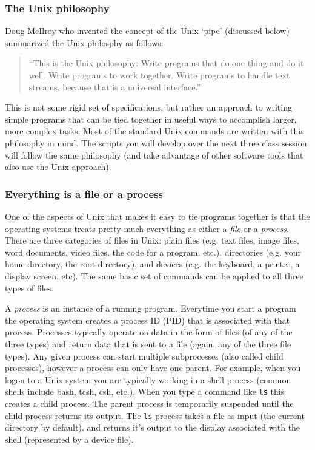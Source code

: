 \subsubsection{The Unix philosophy}

Doug McIlroy who invented the concept of the Unix `pipe' (discussed below) summarized the Unix philosphy as follows:

\begin{quote}
``This is the Unix philosophy: Write programs that do one thing and do it well. Write programs to work together. Write programs to handle text streams, because that is a universal interface.''
\end{quote}

This is not some rigid set of specifications, but rather an approach to writing simple programs that can be tied together in useful ways to accomplish larger, more complex tasks. Most of the standard Unix commands are written with this philosophy in mind. The scripts you will develop over the next three class session will follow the same philosophy (and take advantage of other software tools that also use the Unix approach).


\subsubsection{Everything is a file or a process}

One of the aspects of Unix that makes it easy to tie programs together is that the operating systems treats pretty much everything as either a \emph{file} or a \emph{process}.  There are three categories of files in Unix: plain files (e.g. text files, image files, word documents, video files, the code for a program, etc.), directories (e.g. your home directory, the root directory), and devices (e.g. the keyboard, a printer, a display screen, etc). The same basic set of commands can be applied to all three types of files.

A \emph{process} is an instance of a running program.  Everytime you start a program the operating system creates a process ID (PID) that is associated with that process. Processes typically operate on data in the form of files (of any of the three types) and return data that is sent to a file (again, any of the three file types). Any given process can start multiple subprocesses (also called child processes), however a process can only have one parent. For example, when you logon to a Unix system you are typically working in a shell process (common shells include bash, tcsh, csh, etc.). When you type a command like \verb=ls= this creates a child process. The parent process is temporarily suspended until the child process returns its output. The \verb=ls= process takes a file as input (the current directory by default), and returns it's output to the display associated with the shell (represented by a device file).


